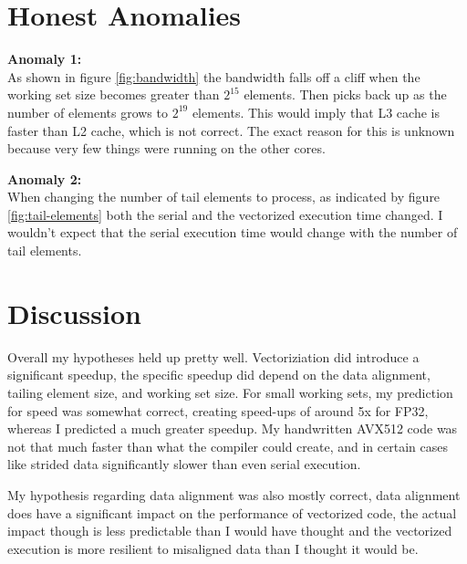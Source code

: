 \documentclass[11pt]{article}
\begin{document}
\section{Honest Anomalies}

\begin{anomalybox}

	\textbf{Anomaly 1:} \\

	As shown in figure \ref{fig:bandwidth} the bandwidth falls off a cliff when the working set size becomes greater than
	$2^{15}$ elements. Then picks back up as the number of elements grows to $2^{19}$ elements. This would imply that L3
	cache is faster than L2 cache, which is not correct. The exact reason for this is unknown because very few things were
	running on the other cores.

	\textbf{Anomaly 2:} \\

	When changing the number of tail elements to process, as indicated by figure \ref{fig:tail-elements} both the serial
	and the vectorized execution time changed. I wouldn't expect that the serial execution time would change with the
	number of tail elements.

\end{anomalybox}

\section{Discussion}

Overall my hypotheses held up pretty well. Vectoriziation did introduce a significant speedup, the specific speedup did
depend on the data alignment, tailing element size, and working set size. For small working sets, my prediction for
speed was somewhat correct, creating speed-ups of around 5x for FP32, whereas I predicted a much greater speedup. My
handwritten AVX512 code was not that much faster than what the compiler could create, and in certain cases like strided
data significantly slower than even serial execution.

My hypothesis regarding data alignment was also mostly correct, data alignment does have a significant impact on the
performance of vectorized code, the actual impact though is less predictable than I would have thought and the
vectorized execution is more resilient to misaligned data than I thought it would be.
\end{document}
